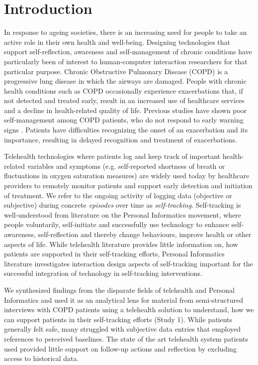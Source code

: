\section{Introduction}
In response to ageing societies, there is an increasing need for people to take an active role in their own health and well-being. Designing technologies that support self-reflection, awareness and self-management of chronic conditions have particularly been of interest to human-computer interaction researchers for that particular purpose. Chronic Obstructive Pulmonary Disease (COPD) is a progressive lung disease in which the airways are damaged. People with chronic health conditions such as COPD occasionally experience exacerbations that, if not detected and treated early, result in an increased use of healthcare services and a decline in health-related quality of life. Previous studies have shown poor self-management among COPD patients, who do not respond to early warning signs \cite{piloting, proactive, third}. Patients have difficulties recognizing the onset of an exacerbation and its importance, resulting in delayed recognition and treatment of exacerbations. 

Telehealth technologies where patients log and keep track of important health-related variables and symptoms (e.g. self-reported shortness of breath or fluctuations in oxygen saturation measures) are widely used today by healthcare providers to remotely monitor patients and support early detection and initiation of treatment. We refer to the ongoing activity of logging data (objective or subjective) during concrete \textit{episodes} over time as \textit{self-tracking}. Self-tracking is well-understood from literature on the Personal Informatics movement, where people voluntarily, self-initiate and successfully use technology to enhance self-awareness, self-reflection and thereby change behaviours, improve health or other aspects of life. While telehealth literature provides little information on, how patients are supported in their self-tracking efforts, Personal Informatics literature investigates interaction design aspects of self-tracking important for the successful integration of technology in self-tracking interventions. 

We synthesized findings from the disparate fields of telehealth and Personal Informatics and used it as an analytical lens for material from semi-structured interviews with COPD patients using a telehealth solution to understand, how we can support patients in their self-tracking efforts (Study 1). While patients generally felt safe, many struggled with subjective data entries that employed references to perceived baselines. The state of the art telehealth system patients used provided little support on follow-up actions and reflection by excluding access to historical data. 

